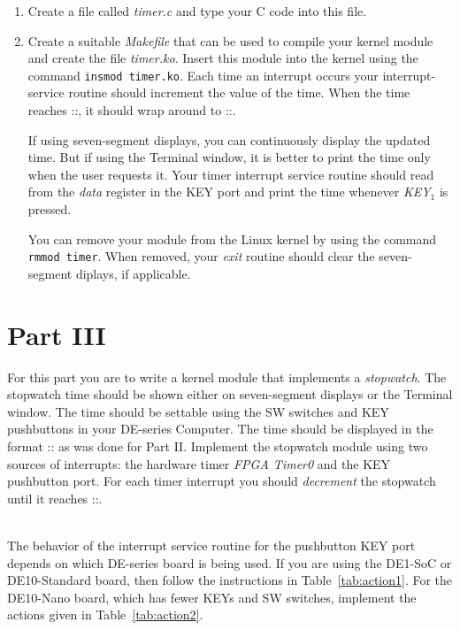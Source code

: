 \documentclass[epsfig,10pt,fullpage]{article}
\begin{document}
\begin{enumerate}
\item Create a file called {\it timer.c} and type your C code into this file.

\item
Create a suitable {\it Makefile} that can be used to compile your kernel module and create the 
file {\it timer.ko}. Insert this module into the kernel using the command \texttt{insmod timer.ko}.
Each time an interrupt occurs your interrupt-service routine should increment the value of the 
time. When the time reaches ::, it should wrap around to 
::. 

If using seven-segment displays, you can continuously display the updated time. But if
using the Terminal window, it is better to print the time only when the user requests it.
Your timer interrupt service routine should read from the {\it data} register in the KEY port 
and print the time whenever {\it KEY}$_1$ is pressed.

You can remove your module from the Linux kernel by using the command 
\texttt{rmmod timer}. When removed, your {\it exit} routine should clear the seven-segment
diplays, if applicable.
\end{enumerate}

\section*{Part III}
\noindent
For this part you are to write a kernel module that implements a {\it stopwatch}. The stopwatch
time should be shown either on seven-segment displays or the Terminal window. The time should 
be settable using the SW switches and KEY pushbuttons in your DE-series Computer. The time 
should be displayed in the format :: as was done for Part II.
Implement the stopwatch module using two sources of interrupts: the hardware timer 
{\it FPGA Timer0} and the KEY pushbutton port. For each timer interrupt you should 
{\it decrement} the stopwatch until it reaches ::.

~\\
\noindent
The behavior of the interrupt service routine for the pushbutton KEY port depends on which
DE-series board is being used. If you are using the DE1-SoC or DE10-Standard board, then
follow the instructions in Table~\ref{tab:action1}. For the DE10-Nano board, which has
fewer KEYs and SW switches, implement the actions given in Table~\ref{tab:action2}.
\end{document}
